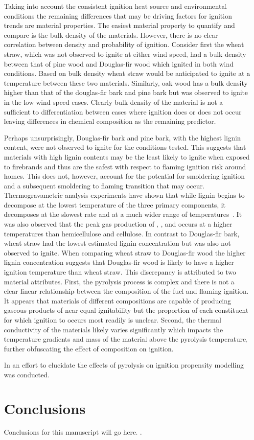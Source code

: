     Taking into account the consistent ignition heat source and environmental conditions the remaining differences that may be driving factors for ignition trends are material properties. 
    The easiest material property to quantify and compare is the bulk density of the materials. However, there is no clear correlation between density and probability of ignition. Consider first the wheat straw, which was not observed to ignite at either wind speed, had a bulk density between that of pine wood and Douglas-fir wood which ignited in both wind conditions. Based on bulk density wheat straw would be anticipated to ignite at a temperature between these two materials. Similarly, oak wood has a bulk density higher than that of the douglas-fir bark and pine bark but was observed to ignite in the low wind speed cases. Clearly bulk density of the material is not a sufficient to differentiation between cases where ignition does or does not occur leaving differences in chemical composition as the remaining predictor. 
    
    Perhaps unsurprisingly, Douglas-fir bark and pine bark, with the highest lignin content, were not observed to ignite for the conditions tested. This suggests that materials with high lignin contents may be the least likely to ignite when exposed to firebrands and thus are the safest with respect to flaming ignition risk around homes. This does not, however, account for the potential for smoldering ignition and a subsequent smoldering to flaming transition that may occur. Thermogravametric analysis experiments have shown that while lignin begins to decompose at the lowest temperature of the three primary components, it decomposes at the slowest rate and at a much wider range of temperatures~\cite{Yang2007a}. It was also observed that the peak gas production of , , and  occurs at a higher temperatures than hemicellulose and cellulose. In contrast to Douglas-fir bark, wheat straw had the lowest estimated lignin concentration but was also not observed to ignite. When comparing wheat straw to Douglas-fir wood the higher lignin concentration suggests that Douglas-fir wood is likely to have a higher ignition temperature than wheat straw. This discrepancy is attributed to two material attributes. First, the pyrolysis process is complex and there is not a clear linear relationship between the composition of the fuel and flaming ignition. It appears that materials of different compositions are capable of producing gaseous products of near equal ignitability but the proportion of each constituent for which ignition to occurs most readily is unclear. Second, the thermal conductivity of the materials likely varies significantly which impacts the temperature gradients and mass of the material above the pyrolysis temperature, further obfuscating the effect of composition on ignition. 
    
    In an effort to elucidate the effects of pyrolysis on ignition propensity modelling was conducted. 
    
    \section{Conclusions}
    Conclusions for this manuscript will go here.
    \cite{MacLean1941}.
    

    
   